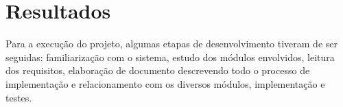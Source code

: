 \chapter{Resultados}
\label{chap:resultados}
Para a execução do projeto, algumas etapas de desenvolvimento tiveram de ser seguidas: familiarização com o sistema, estudo dos módulos envolvidos, leitura dos requisitos, elaboração de documento descrevendo todo o processo de implementação e relacionamento com os diversos módulos, implementação e testes.

\clearpage